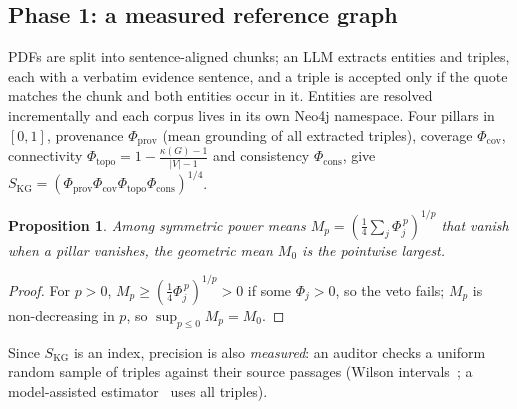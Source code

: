 \documentclass[conference]{IEEEtran}
\newtheorem{proposition}{Proposition}
\begin{document}
\subsection{Phase 1: a measured reference graph}
PDFs are split into sentence-aligned chunks; an LLM extracts entities and triples, each with a verbatim evidence
sentence, and a triple is accepted only if the quote matches the chunk and both entities occur in it. Entities are
resolved incrementally and each corpus lives in its own Neo4j namespace. Four pillars in $[0,1]$, provenance
$\Phi_{\mathrm{prov}}$ (mean grounding of all extracted triples), coverage $\Phi_{\mathrm{cov}}$, connectivity
$\Phi_{\mathrm{topo}}=1-\frac{\kappa(G)-1}{|V|-1}$ and consistency $\Phi_{\mathrm{cons}}$, give
$S_{\mathrm{KG}}=(\Phi_{\mathrm{prov}}\Phi_{\mathrm{cov}}\Phi_{\mathrm{topo}}\Phi_{\mathrm{cons}})^{1/4}$.
\begin{proposition}\label{prop:gm}
Among symmetric power means $M_p=(\frac14\sum_j\Phi_j^{\,p})^{1/p}$ that vanish when a pillar vanishes, the geometric
mean $M_0$ is the pointwise largest.
\end{proposition}
\begin{proof}
For $p>0$, $M_p\ge(\frac14\Phi_j^{\,p})^{1/p}>0$ if some $\Phi_j>0$, so the veto fails; $M_p$ is non-decreasing in $p$,
so $\sup_{p\le0}M_p=M_0$.
\end{proof}
Since $S_{\mathrm{KG}}$ is an index, precision is also \emph{measured}: an auditor checks a uniform random sample of
triples against their source passages (Wilson intervals~\cite{wilson1927probable}; a model-assisted
estimator~\cite{sarndal1992model} uses all triples).
\end{document}
